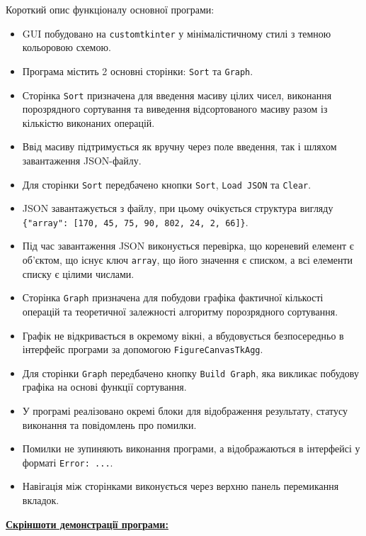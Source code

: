 \documentclass[12pt,a4paper]{article}
\begin{document}
    \noindent
    Короткий опис функціоналу основної програми:

    \begin{itemize}
        \item GUI побудовано на \texttt{customtkinter} у мінімалістичному стилі з темною кольоровою схемою.
        \item Програма містить 2 основні сторінки: \texttt{Sort} та \texttt{Graph}.
        \item Сторінка \texttt{Sort} призначена для введення масиву цілих чисел, виконання порозрядного сортування та виведення відсортованого масиву разом із кількістю виконаних операцій.
        \item Ввід масиву підтримується як вручну через поле введення, так і шляхом завантаження JSON-файлу.
        \item Для сторінки \texttt{Sort} передбачено кнопки \texttt{Sort}, \texttt{Load JSON} та \texttt{Clear}.
        \item JSON завантажується з файлу, при цьому очікується структура вигляду \texttt{\{"array": [170, 45, 75, 90, 802, 24, 2, 66]\}}.
        \item Під час завантаження JSON виконується перевірка, що кореневий елемент є об'єктом, що існує ключ \texttt{array}, що його значення є списком, а всі елементи списку є цілими числами.
        \item Сторінка \texttt{Graph} призначена для побудови графіка фактичної кількості операцій та теоретичної залежності алгоритму порозрядного сортування.
        \item Графік не відкривається в окремому вікні, а вбудовується безпосередньо в інтерфейс програми за допомогою \texttt{FigureCanvasTkAgg}.
        \item Для сторінки \texttt{Graph} передбачено кнопку \texttt{Build Graph}, яка викликає побудову графіка на основі функції сортування.
        \item У програмі реалізовано окремі блоки для відображення результату, статусу виконання та повідомлень про помилки.
        \item Помилки не зупиняють виконання програми, а відображаються в інтерфейсі у форматі \texttt{Error: ...}.
        \item Навігація між сторінками виконується через верхню панель перемикання вкладок.
    \end{itemize}

    \newpage

    \noindent
    \underline{\textbf{Скріншоти демонстрації програми:}}
\end{document}
